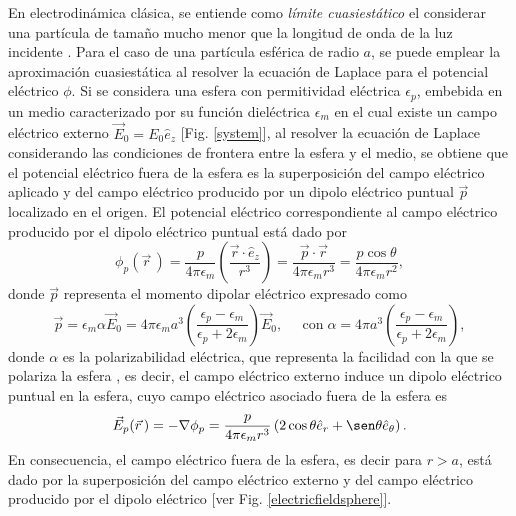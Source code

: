 En electrodinámica clásica, se entiende como \textit{límite cuasiestático} el considerar una partícula de tamaño mucho menor que la longitud de onda de la luz incidente \cite{Cuasiestatico}. Para el caso de una partícula esférica de radio $a$, se puede emplear la aproximación cuasiestática al resolver la ecuación de Laplace para el potencial eléctrico $\phi$. Si se considera una esfera con permitividad eléctrica $\epsilon_p$, embebida en un medio caracterizado por su función dieléctrica $\epsilon_m$ en el cual existe un campo eléctrico externo $\Vec{E}_0=E_0\hat{e}_z$ [Fig. \ref{system}], al resolver la ecuación de Laplace considerando las condiciones de frontera entre la esfera y el medio, se obtiene que el potencial eléctrico fuera de la esfera es la superposición del campo eléctrico aplicado y del campo eléctrico producido por un dipolo eléctrico puntual $\vec{p}$ localizado en el origen. El potencial eléctrico correspondiente al campo eléctrico producido por el dipolo eléctrico puntual está dado por \cite{Griffiths}
\begin{equation}
	\phi_p(\vec{r}\,)=\frac{p}{4\pi\epsilon_m}\left(\frac{\Vec{r}\cdot\hat{e}_z}{r^3}\right)=\frac{\Vec{p}\cdot\Vec{r}}{4\pi\epsilon_m r^3}=\frac{p\cos\theta}{4\pi\epsilon_m r^2},
	\label{pot_dipolo}
\end{equation}
donde $\Vec{p}$ representa el momento dipolar eléctrico expresado como \cite{Bohren}
\begin{equation*}
	\vec{p}= \epsilon_m\alpha\Vec{E}_0=4\pi\epsilon_m a^3\left(\frac{\epsilon_p-\epsilon_m}{\epsilon_p+2\epsilon_m}\right)\Vec{E}_0, \;\:\:\:\:\: \text{con}\; \alpha=4\pi a^3\left(\frac{\epsilon_p-\epsilon_m}{\epsilon_p+2\epsilon_m}\right), 
	\label{momentdipol}
\end{equation*}
donde $\alpha$ es la polarizabilidad eléctrica, que representa la facilidad con la que se polariza la esfera \cite{Griffiths}, es decir, el campo eléctrico externo induce un dipolo eléctrico puntual en la esfera, cuyo campo eléctrico asociado fuera de la esfera es 
\begin{equation*}
	\Vec{E}_p(\vec{r}\,)=-\nabla \phi_p =\frac{p}{4\pi \epsilon_m r^3 }\left(2\cos\theta\hat{e}_r+\sen\theta\hat{e}_{\theta}\right).
\end{equation*}
En consecuencia, el campo eléctrico fuera de la esfera, es decir para $r>a$, está dado por la superposición del campo eléctrico externo y del campo eléctrico producido por el dipolo eléctrico [ver Fig. \ref{electricfieldsphere}].


